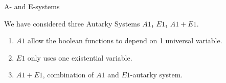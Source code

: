 \documentclass[xcolor=table	]{beamer}
\begin{document}
\begin{frame}{A- and E-systems}

\vspace{0.4cm}

We have considered three Autarky Systems \newline 
\textbf{$A1$, $E1$, $A1 + E1$}. \newline

\begin{enumerate}
	\item $A1$ allow the boolean functions to  
	depend on 1 universal variable.
	
	\item $E1$ only uses one existential variable.
	
	\item $A1 + E1$, combination of $A1$ and $E1$-autarky system.
\end{enumerate}

\end{frame}
\end{document}
